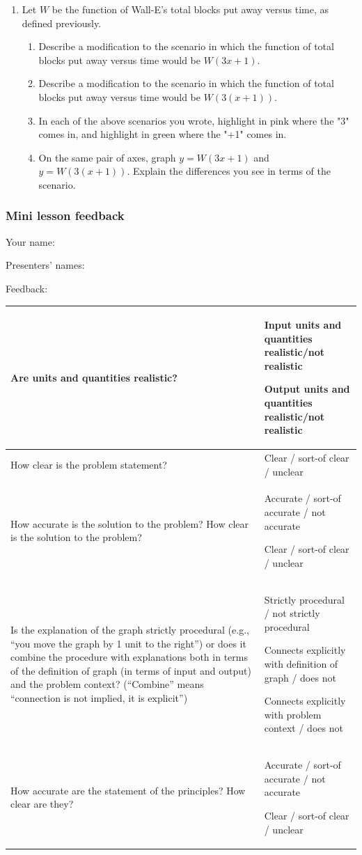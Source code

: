 \documentclass[11pt]{article}
\newcommand{\handout}{\subsubsection}
\theoremstyle{definition}
\begin{document}
\begin{enumerate}[resume]
\item Let $W$ be the function of Wall-E's total blocks put away versus time, as defined previously.
	\begin{enumerate}
	\item Describe a modification to the scenario in which the function of total blocks put away versus time would be $W(3x+1)$. 
	\item  Describe a modification to the scenario in which the function of total blocks put away versus time would be $W(3(x+1))$. 
	\item In each of the above scenarios you wrote, highlight in pink where the "3" comes in, and highlight in green where the "+1" comes in. 
	\item On the same pair of axes, graph $y=W(3x+1)$ and $y=W(3(x+1))$. Explain the differences you see in terms of the scenario.
	\end{enumerate} 
\end{enumerate}




\newpage
\handout{Mini lesson feedback}

Your name: 

Presenters' names:

Feedback:
\begin{tabular}{L{2.3in}|L{4.5in}}
\hline 
Are units and quantities realistic? \vspace*{0.5in}
	& 
	Input units and quantities realistic/not realistic
	
	Output units and quantities realistic/not realistic
\\ 
\hline
How clear is the problem statement?\vspace*{0.5in}
	& 
	Clear / sort-of clear / unclear 
\\ 
\hline
How accurate is the solution to the problem? How clear is the solution to the problem? \vspace*{0.5in}
	& 
	Accurate / sort-of accurate / not accurate  
	
	Clear / sort-of clear / unclear 
\\ 
\hline
Is the explanation of the graph strictly procedural (e.g., ``you move the graph by 1 unit to the right'') or does it combine the procedure with explanations both in terms of the definition of graph (in terms of input and output) and the problem context? (``Combine'' means ``connection is not implied, it is explicit'') \vspace*{1in}
	&
	Strictly procedural / not strictly procedural
	
	Connects explicitly with definition of graph /  does not 
	
	Connects explicitly with problem context / does not \\
\hline
How accurate are the statement of the principles? How clear are they?  \vspace*{1in}
	& Accurate / sort-of accurate / not accurate  
	
	Clear / sort-of clear / unclear  \\ 
\hline
\end{tabular}
\end{document}
